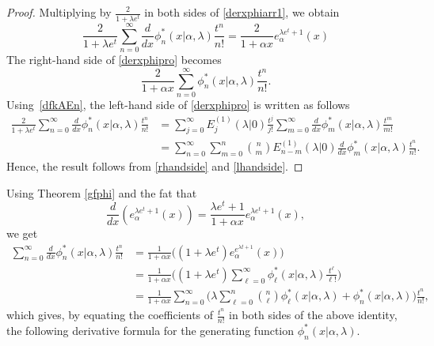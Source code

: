 \documentclass{amsart}
\numberwithin{equation}{section}
\theoremstyle{definition}
\theoremstyle{remark}
\begin{document}
\begin{proof}
Multiplying by $\frac{2}{1+\lambda e^{t}}$ in both sides of \eqref{derxphiarr1}, we obtain
   \begin{equation}\label{derxphipro}
     \frac{2}{1+\lambda e^{t}}\sum_{n=0}^{\infty}\frac{d}{dx}\phi^{*}_{n}(x|\alpha,\lambda)\frac{t^n}{n!}=\frac{2}{1+\alpha x}e_{\alpha}^{\lambda e^{t}+1}(x) 
   \end{equation} 
The right-hand side of \eqref{derxphipro} becomes
\begin{equation}\label{rhandside}
   \frac{2}{1+\alpha x}\sum_{n=0}^{\infty}\phi^{*}_{n}(x|\alpha,\lambda)\frac{t^{n}}{n!}. 
\end{equation}
Using~\eqref{dfkAEn}, the left-hand side of \eqref{derxphipro} is written as follows
\begin{align}
 \frac{2}{1+\lambda e^{t}}\sum_{n=0}^{\infty}\frac{d}{dx}\phi^{*}_{n}(x|\alpha,\lambda)\frac{t^n}{n!}&=\sum_{j=0}^{\infty}E^{(1)}_{j}(\lambda|0)\frac{t^{j}}{j!}\sum_{m=0}^{\infty}\frac{d}{dx}\phi^{*}_{m}(x|\alpha,\lambda)\frac{t^m}{m!}\\
 &=\sum_{n=0}^{\infty}\sum_{m=0}^{n}\binom{n}{m}E^{(1)}_{n-m}(\lambda|0)\frac{d}{dx}\phi_{m}^{*}(x|\alpha,\lambda)\frac{t^{n}}{n!}\label{lhandside}.
\end{align}
Hence, the result follows from \eqref{rhandside} and \eqref{lhandside}.
\end{proof}
Using Theorem \ref{gfphi} and the fat that   
\begin{equation}\label{derxphi1}
      \frac{d}{dx}(e_{\alpha}^{\lambda e^t+1}(x))=\frac{\lambda e^t+1}{1+\alpha x}e_{\alpha}^{\lambda e^t+1}(x),
\end{equation}
we get
\begin{align}
    \sum_{n=0}^{\infty}\frac{d}{dx}\phi^{*}_{n}(x|\alpha,\lambda)\frac{t^n}{n!}\label{derxphiarr1}&=\frac{1}{1+\alpha x}\bigg((1+ \lambda e^{t})e_{\alpha}^{e^{\lambda t+1}}(x)\bigg)\\ 
    &=\frac{1}{1+\alpha x}\bigg((1+ \lambda e^{t})\sum_{\ell=0}^{\infty}\phi^{*}_{\ell}(x|\alpha,\lambda)\frac{t^\ell}{\ell!}\bigg)\\ 
    &=\frac{1}{1+\alpha x}\sum_{n=0}^{\infty}\bigg(\lambda\sum_{\ell=0}^{n}\binom{n}{\ell}\phi^{*}_{\ell}(x|\alpha,\lambda)+\phi^{*}_{n}(x|\alpha,\lambda)\bigg)\frac{t^n}{n!}\text{,}  
\end{align}
which gives, by equating the coefficients of $\frac{t^n}{n!}$ in both sides of the above identity, the following derivative formula for the generating function $\phi^{*}_{n}(x|\alpha,\lambda)$.
\end{document}
